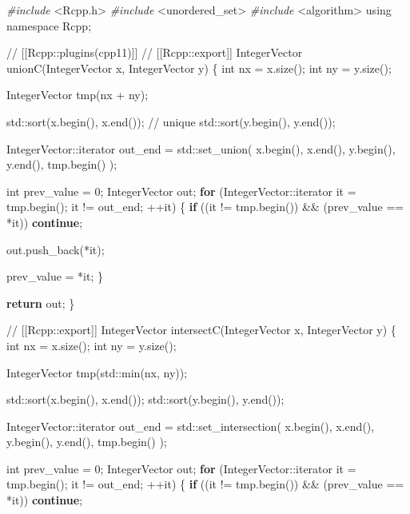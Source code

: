 \documentclass[
]{krantz}
\makeatletter
\newenvironment{Shaded}{\begin{snugshade}}{\end{snugshade}}
\newcommand{\BuiltInTok}[1]{#1}
\newcommand{\CommentTok}[1]{\textcolor[rgb]{0.56,0.35,0.01}{\textit{#1}}}
\newcommand{\ControlFlowTok}[1]{\textcolor[rgb]{0.13,0.29,0.53}{\textbf{#1}}}
\newcommand{\DataTypeTok}[1]{\textcolor[rgb]{0.13,0.29,0.53}{#1}}
\newcommand{\DecValTok}[1]{\textcolor[rgb]{0.00,0.00,0.81}{#1}}
\newcommand{\ImportTok}[1]{#1}
\newcommand{\KeywordTok}[1]{\textcolor[rgb]{0.13,0.29,0.53}{\textbf{#1}}}
\newcommand{\NormalTok}[1]{#1}
\newcommand{\PreprocessorTok}[1]{\textcolor[rgb]{0.56,0.35,0.01}{\textit{#1}}}
\newenvironment{kframe}{%
\medskip{}
\setlength{\fboxsep}{.8em}
 \def\at@end@of@kframe{}%
 \ifinner\ifhmode%
  \def\at@end@of@kframe{\end{minipage}}%
  \begin{minipage}{\columnwidth}%
 \fi\fi%
 \def\FrameCommand##1{\hskip\@totalleftmargin \hskip-\fboxsep
 \colorbox{shadecolor}{##1}\hskip-\fboxsep
     \hskip-\linewidth \hskip-\@totalleftmargin \hskip\columnwidth}%
 \MakeFramed {\advance\hsize-\width
   \@totalleftmargin\z@ \linewidth\hsize
   \@setminipage}}%
 {\par\unskip\endMakeFramed%
 \at@end@of@kframe}
\renewenvironment{Shaded}{\begin{kframe}}{\end{kframe}}
\renewcommand{\KeywordTok} [1]{\textcolor[rgb]{0.00,0.44,0.13}{{#1}}}
\renewcommand{\DataTypeTok}[1]{\textcolor[rgb]{0.56,0.13,0.00}{{#1}}}
\renewcommand{\DecValTok}  [1]{\textcolor[rgb]{0.25,0.63,0.44}{{#1}}}
\renewcommand{\CommentTok} [1]{\textcolor[rgb]{0.38,0.63,0.69}{{#1}}}
\renewcommand{\NormalTok}  [1]{{#1}}
\makeatother
\begin{document}
\begin{Shaded}
\begin{Highlighting}[]
\PreprocessorTok{#include }\ImportTok{<Rcpp.h>}
\PreprocessorTok{#include }\ImportTok{<unordered_set>}
\PreprocessorTok{#include }\ImportTok{<algorithm>}
\KeywordTok{using} \KeywordTok{namespace}\NormalTok{ Rcpp;}

\CommentTok{// [[Rcpp::plugins(cpp11)]]}
\CommentTok{// [[Rcpp::export]]}
\NormalTok{IntegerVector unionC(IntegerVector x, IntegerVector y) \{}
  \DataTypeTok{int}\NormalTok{ nx = x.size();}
  \DataTypeTok{int}\NormalTok{ ny = y.size();}
  
\NormalTok{  IntegerVector tmp(nx + ny);}
  
  \BuiltInTok{std::}\NormalTok{sort(x.begin(), x.end()); }\CommentTok{// unique}
  \BuiltInTok{std::}\NormalTok{sort(y.begin(), y.end());}
  
\NormalTok{  IntegerVector::iterator out_end = }\BuiltInTok{std::}\NormalTok{set_union(}
\NormalTok{    x.begin(), x.end(), y.begin(), y.end(), tmp.begin()}
\NormalTok{  );}
  
  \DataTypeTok{int}\NormalTok{ prev_value = }\DecValTok{0}\NormalTok{;}
\NormalTok{  IntegerVector out;}
  \ControlFlowTok{for}\NormalTok{ (IntegerVector::iterator it = tmp.begin();}
\NormalTok{       it != out_end; ++it) \{}
    \ControlFlowTok{if}\NormalTok{ ((it != tmp.begin())  && (prev_value == *it)) }\ControlFlowTok{continue}\NormalTok{;}
    
\NormalTok{    out.push_back(*it);}
    
\NormalTok{    prev_value = *it;}
\NormalTok{  \}}
  
  \ControlFlowTok{return}\NormalTok{ out;}
\NormalTok{\}}

\CommentTok{// [[Rcpp::export]]}
\NormalTok{IntegerVector intersectC(IntegerVector x, IntegerVector y) \{}
  \DataTypeTok{int}\NormalTok{ nx = x.size();}
  \DataTypeTok{int}\NormalTok{ ny = y.size();}
  
\NormalTok{  IntegerVector tmp(}\BuiltInTok{std::}\NormalTok{min(nx, ny));}
  
  \BuiltInTok{std::}\NormalTok{sort(x.begin(), x.end());}
  \BuiltInTok{std::}\NormalTok{sort(y.begin(), y.end());}
  
\NormalTok{  IntegerVector::iterator out_end = }\BuiltInTok{std::}\NormalTok{set_intersection(}
\NormalTok{    x.begin(), x.end(), y.begin(), y.end(), tmp.begin()}
\NormalTok{  );}
  
  \DataTypeTok{int}\NormalTok{ prev_value = }\DecValTok{0}\NormalTok{;  }
\NormalTok{  IntegerVector out;}
  \ControlFlowTok{for}\NormalTok{ (IntegerVector::iterator it = tmp.begin();}
\NormalTok{       it != out_end; ++it) \{}
    \ControlFlowTok{if}\NormalTok{ ((it != tmp.begin())  && (prev_value == *it)) }\ControlFlowTok{continue}\NormalTok{;}
    

\end{Highlighting}
\end{Shaded}
\end{document}
